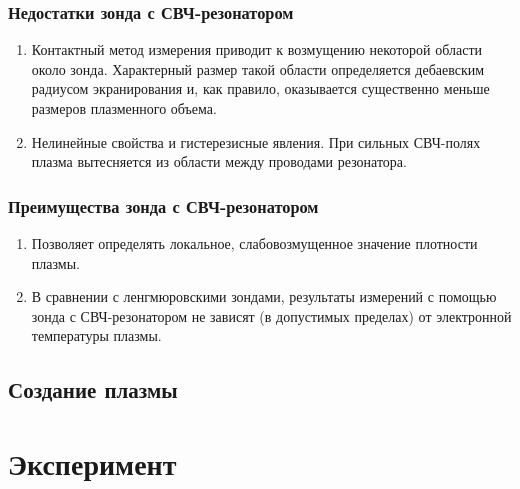 \documentclass[10pt,pdf,hyperref={unicode}, dvipsnames]{beamer}
\begin{document}
\begin{frame}
	\frametitle{Недостатки зонда с СВЧ-резонатором}
	\begin{enumerate}
		\item Контактный метод измерения приводит к возмущению некоторой области около зонда. Характерный размер такой области определяется дебаевским радиусом экранирования и, как правило, оказывается существенно меньше размеров плазменного объема.
		\item Нелинейные свойства и гистерезисные явления. При сильных СВЧ-полях плазма вытесняется из области между проводами резонатора.
	\end{enumerate}
\end{frame}

\begin{frame}
	\frametitle{Преимущества зонда с СВЧ-резонатором}
	\begin{enumerate}
		\item Позволяет определять локальное, слабовозмущенное значение плотности плазмы. 
		\item В сравнении с ленгмюровскими зондами, результаты измерений с помощью зонда с СВЧ-резонатором не зависят (в допустимых пределах) от электронной температуры плазмы. %

	\end{enumerate}
\end{frame}
    


\subsection{Создание плазмы}
\section{Эксперимент}
\end{document}
